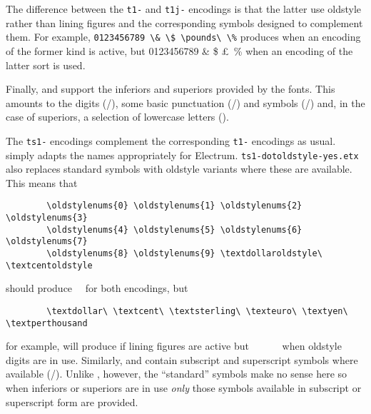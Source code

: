 \documentclass[11pt,british]{article}
\begin{document}
The difference between the \verb|t1-| and \verb|t1j-| encodings is that the latter use oldstyle rather than lining figures and the corresponding symbols designed to complement them. For example, \verb|0123456789 \& \$ \pounds\ \%| produces  when an encoding of the former kind is active, but 0123456789 \& \$ \pounds\ \% when an encoding of the latter sort is used.

Finally,  and  support the inferiors and superiors provided by the fonts. This amounts to the digits (/), some basic punctuation (/) and symbols (\textin{+\pounds\$}/\textsu{+\pounds\$}) and, in the case of superiors, a selection of lowercase letters ().

The \verb|ts1-| encodings complement the corresponding \verb|t1-| encodings as usual.  simply adapts the names appropriately for Electrum. \verb|ts1-dotoldstyle-yes.etx| also replaces standard symbols with oldstyle variants where these are available. This means that
	\begin{verbatim}
		\oldstylenums{0} \oldstylenums{1} \oldstylenums{2} \oldstylenums{3} 
		\oldstylenums{4} \oldstylenums{5} \oldstylenums{6} \oldstylenums{7} 
		\oldstylenums{8} \oldstylenums{9} \textdollaroldstyle\ \textcentoldstyle
	\end{verbatim}
	should produce           \textdollaroldstyle\ \textcentoldstyle\ for both encodings, but
	\begin{verbatim}
		\textdollar\ \textcent\ \textsterling\ \texteuro\ \textyen\ \textperthousand
	\end{verbatim}
	for example, will produce \textl{\textdollar\ \textcent\ \textsterling\ \texteuro\ \textyen\ \textperthousand\ }if lining figures are active but \textdollar\ \textcent\ \textsterling\ \texteuro\ \textyen\ \textperthousand\ when oldstyle digits are in use. Similarly,  and  contain subscript and superscript symbols where available (\textin{\texteuro \textsterling \textyen \textdollar \textcent}/\textsu{\texteuro \textsterling \textyen \textdollar \textcent}). Unlike , however, the ``standard'' symbols make no sense here so when inferiors or superiors are in use \emph{only} those symbols available in subscript or superscript form are provided.
\end{document}
